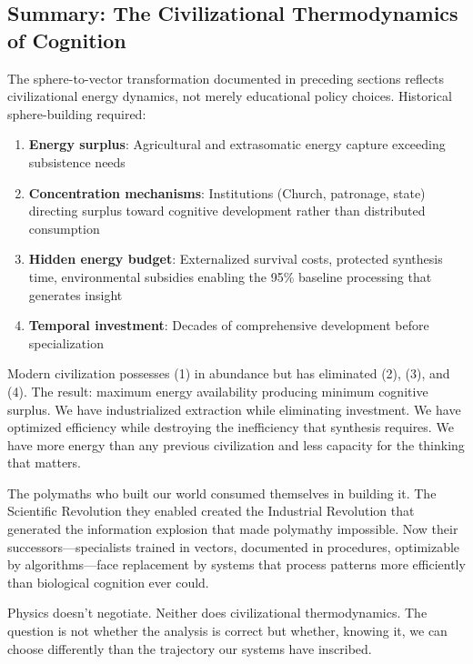 \subsection{Summary: The Civilizational Thermodynamics of Cognition}

The sphere-to-vector transformation documented in preceding sections reflects civilizational energy dynamics, not merely educational policy choices. Historical sphere-building required:

\begin{enumerate}
    \item \textbf{Energy surplus}: Agricultural and extrasomatic energy capture exceeding subsistence needs
    \item \textbf{Concentration mechanisms}: Institutions (Church, patronage, state) directing surplus toward cognitive development rather than distributed consumption
    \item \textbf{Hidden energy budget}: Externalized survival costs, protected synthesis time, environmental subsidies enabling the 95\% baseline processing that generates insight
    \item \textbf{Temporal investment}: Decades of comprehensive development before specialization
\end{enumerate}

Modern civilization possesses (1) in abundance but has eliminated (2), (3), and (4). The result: maximum energy availability producing minimum cognitive surplus. We have industrialized extraction while eliminating investment. We have optimized efficiency while destroying the inefficiency that synthesis requires. We have more energy than any previous civilization and less capacity for the thinking that matters.

The polymaths who built our world consumed themselves in building it. The Scientific Revolution they enabled created the Industrial Revolution that generated the information explosion that made polymathy impossible. Now their successors---specialists trained in vectors, documented in procedures, optimizable by algorithms---face replacement by systems that process patterns more efficiently than biological cognition ever could.

Physics doesn't negotiate. Neither does civilizational thermodynamics. The question is not whether the analysis is correct but whether, knowing it, we can choose differently than the trajectory our systems have inscribed.